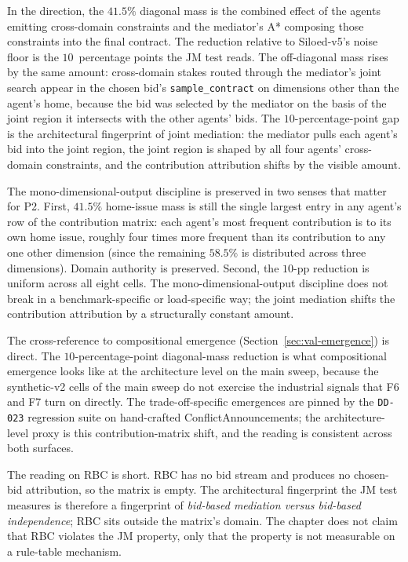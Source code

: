 In the \NEXUS{} direction, the $41.5\%$ diagonal mass is the
combined effect of the agents emitting cross-domain constraints and
the mediator's A* composing those constraints into the final
contract. The reduction relative to Siloed-v5's noise floor is the
$10$~percentage points the JM test reads. The off-diagonal mass
rises by the same amount: cross-domain stakes routed through the
mediator's joint search appear in the chosen bid's
\texttt{sample\_contract} on dimensions other than the agent's home,
because the bid was selected by the mediator on the basis of the
joint region it intersects with the other agents' bids. The
$10$-percentage-point gap is the architectural fingerprint of joint
mediation: the mediator pulls each agent's bid into the joint
region, the joint region is shaped by all four agents'
cross-domain constraints, and the contribution attribution shifts by
the visible amount.

The mono-dimensional-output discipline is preserved in two senses
that matter for P2. First, $41.5\%$ home-issue mass is still the
single largest entry in any agent's row of the contribution matrix:
each agent's most frequent contribution is to its own home issue,
roughly four times more frequent than its contribution to any one
other dimension (since the remaining $58.5\%$ is distributed across
three dimensions). Domain authority is preserved. Second, the
$10$-pp reduction is uniform across all eight cells. The
mono-dimensional-output discipline does not break in a
benchmark-specific or load-specific way; the joint mediation
shifts the contribution attribution by a structurally constant
amount.

The cross-reference to compositional emergence
(Section~\ref{sec:val-emergence}) is direct. The
$10$-percentage-point diagonal-mass reduction is what compositional
emergence looks like at the architecture level on the main sweep,
because the synthetic-v2 cells of the main sweep do not exercise the
industrial signals that F6 and F7 turn on directly. The trade-off-specific
emergences are pinned by the \texttt{DD-023} regression suite on
hand-crafted ConflictAnnouncements; the architecture-level proxy is
this contribution-matrix shift, and the reading is consistent across
both surfaces.

The reading on RBC is short. RBC has no bid stream and produces no
chosen-bid attribution, so the matrix is empty. The architectural
fingerprint the JM test measures is therefore a fingerprint of
\emph{bid-based mediation versus bid-based independence}; RBC sits
outside the matrix's domain. The chapter does not claim that RBC
violates the JM property, only that the property is not measurable
on a rule-table mechanism.

